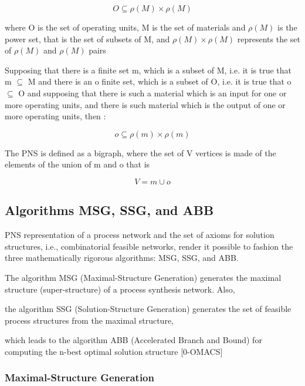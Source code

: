\begin{equation}
O\subseteq \rho(M) \times  \rho(M)\label{eq:second}
\end{equation}

where O is the set of operating units, M is the set of materials and $\rho(M)$ is the power set, 
that is the set of subsets of M, and $\rho(M) \times  \rho(M)$ represents the set of $\rho(M)$ and $\rho(M)$ pairs

Supposing that there is a finite set m, which is a subset of M, i.e. it is true that m $\subseteq$ M 
and there is an o finite set, which is a subset of O, i.e. 
it is true that o $\subseteq$ O and supposing that there is such a material
which is an input for one or more operating units, and there is such material 
which is the output of one or more operating units, then :

\begin{equation}
o\subseteq \rho(m) \times  \rho(m)\label{eq:second}
\end{equation}


The PNS is defined as a bigraph, where the set of V vertices is made of the elements of the union of m and o that is

\begin{equation}
V = m \cup o\label{eq:nex}
\end{equation}
 
 

\subsection{ Algorithms MSG, SSG, and ABB }
PNS representation of a process network and the set of  axioms for solution structures, i.e.,
combinatorial feasible networks, render it possible to fashion the three mathematically rigorous algorithms:
MSG, SSG, and ABB. 

The algorithm MSG (Maximal-Structure Generation) generates the maximal structure (super-structure)
of a process synthesis network.
Also, 

the algorithm SSG (Solution-Structure Generation) generates the set of feasible process structures from the maximal structure,

which leads to the algorithm ABB (Accelerated Branch and Bound) for computing the n-best optimal solution structure
[0-OMACS]

\subsubsection{Maximal-Structure Generation}

